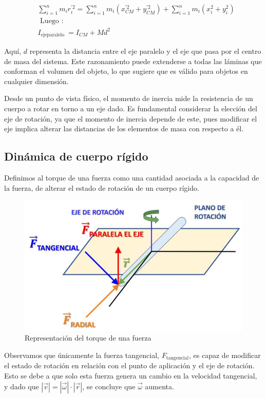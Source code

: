 \documentclass[10pt]{article}
\begin{document}
$$
\begin{aligned}
& \sum_{i=1}^{n} m_{i} r_{i}^{\prime 2}=\sum_{i=1}^{n} m_{i}\left(x_{C M}^{\prime 2}+y_{C M}^{\prime 2}\right)+\sum_{i=1}^{n} m_{i}\left(x_{i}^{2}+y_{i}^{2}\right) \\
& \text { Luego }: \\
& I_{\text {ejeparalelo }}=I_{C M}+M d^{2}
\end{aligned}
$$


Aquí, $d$ representa la distancia entre el eje paralelo y el eje que pasa por el centro de masa del sistema.  
Este razonamiento puede extenderse a todas las láminas que conforman el volumen del objeto, lo que sugiere que es válido para objetos en cualquier dimensión.  

Desde un punto de vista físico, el momento de inercia mide la resistencia de un cuerpo a rotar en torno a un eje dado.  
Es fundamental considerar la elección del eje de rotación, ya que el momento de inercia depende de este, pues modificar el eje implica alterar las distancias de los elementos de masa con respecto a él.
\subsection{Dinámica de cuerpo rígido}
Definimos al torque de una fuerza como una cantidad asociada a la capacidad de la fuerza, de alterar el estado de rotación de un cuerpo rígido.\\

\begin{figure}[H]
    \centering
\includegraphics[scale = 0.30, center]{2025_04_01_ea720b93e8ebb5d0c6aeg-06}
\caption{Representación del torque de una fuerza }
\end{figure}


Observamos que únicamente la fuerza tangencial, $F_{\text{tangencial}}$, es capaz de modificar el estado de rotación en relación con el punto de aplicación y el eje de rotación.  
Esto se debe a que solo esta fuerza genera un cambio en la velocidad tangencial, y dado que $|\vec{v}| = |\vec{\omega}| \cdot |\vec{r}|$, se concluye que $\vec{\omega}$ aumenta.  
\end{document}

